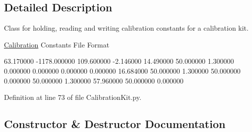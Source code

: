 \subsection{Detailed Description}
Class for holding, reading and writing calibration constants for a calibration kit. 

\hyperlink{namespaceSignalIntegrity_1_1Measurement_1_1Calibration}{Calibration} Constants File Format

\begin{DoxyVerb}     %
     63.170000 
     -1178.000000
     109.600000
     -2.146000
     14.490000
     50.000000
     1.300000
     0.000000
     0.000000
     0.000000
     0.000000
     16.684000
     50.000000
     1.300000
     50.000000
     0.000000
     50.000000
     1.300000
     57.960000
     50.000000
     0.000000\end{DoxyVerb}
 

Definition at line 73 of file Calibration\+Kit.\+py.



\subsection{Constructor \& Destructor Documentation}
\mbox{\label{classSignalIntegrity_1_1Measurement_1_1CalKit_1_1CalibrationKit_1_1CalibrationConstants_ae64f0875afe3067b97ba370b354b9213}} 
